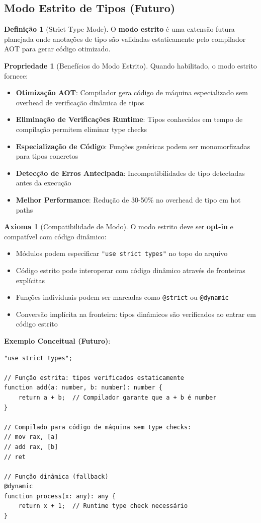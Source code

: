 \documentclass[12pt,a4paper]{article}
\theoremstyle{definition}
\newtheorem{definition}{Definição}[section]
\newtheorem{axiom}{Axioma}[section]
\newtheorem{property}{Propriedade}[section]
\begin{document}
\subsection{Modo Estrito de Tipos (Futuro)}

\begin{definition}[Strict Type Mode]
O \textbf{modo estrito} é uma extensão futura planejada onde anotações de tipo são validadas estaticamente pelo compilador AOT para gerar código otimizado.
\end{definition}

\begin{property}[Benefícios do Modo Estrito]
Quando habilitado, o modo estrito fornece:
\begin{itemize}
    \item \textbf{Otimização AOT}: Compilador gera código de máquina especializado sem overhead de verificação dinâmica de tipos
    \item \textbf{Eliminação de Verificações Runtime}: Tipos conhecidos em tempo de compilação permitem eliminar type checks
    \item \textbf{Especialização de Código}: Funções genéricas podem ser monomorfizadas para tipos concretos
    \item \textbf{Detecção de Erros Antecipada}: Incompatibilidades de tipo detectadas antes da execução
    \item \textbf{Melhor Performance}: Redução de 30-50\% no overhead de tipo em hot paths
\end{itemize}
\end{property}

\begin{axiom}[Compatibilidade de Modo]
O modo estrito deve ser \textbf{opt-in} e compatível com código dinâmico:
\begin{itemize}
    \item Módulos podem especificar \texttt{"use strict types"} no topo do arquivo
    \item Código estrito pode interoperar com código dinâmico através de fronteiras explícitas
    \item Funções individuais podem ser marcadas como \texttt{@strict} ou \texttt{@dynamic}
    \item Conversão implícita na fronteira: tipos dinâmicos são verificados ao entrar em código estrito
\end{itemize}
\end{axiom}

\textbf{Exemplo Conceitual (Futuro)}:
\begin{verbatim}
"use strict types";

// Função estrita: tipos verificados estaticamente
function add(a: number, b: number): number {
    return a + b;  // Compilador garante que a + b é number
}

// Compilado para código de máquina sem type checks:
// mov rax, [a]
// add rax, [b]
// ret

// Função dinâmica (fallback)
@dynamic
function process(x: any): any {
    return x + 1;  // Runtime type check necessário
}
\end{verbatim}
\end{document}
